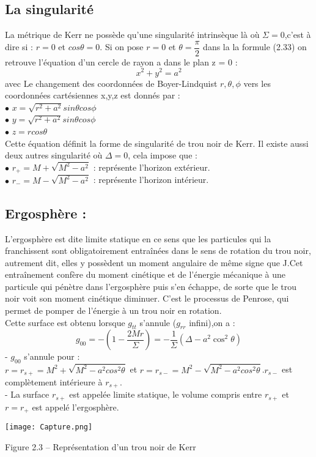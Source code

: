 \documentclass[12pt,  a4paper, openright]{report} %
\begin{document}
\subsection*{La singularité}
La métrique de Kerr ne possède qu’une singularité intrinsèque là où $ \Sigma= 0$,c'est à dire si : $r = 0$ et $ cos\theta = 0$.
Si on pose $r = 0$ et $\theta =\dfrac{\pi}{2}  $ dans la la formule (2.33) on retrouve l’équation d’un cercle de rayon a dans le plan z = 0 :
\begin{equation}
x^{2} + y^{2} = a^{2}
\end{equation}
avec Le changement des coordonnées de Boyer-Lindquist $r,\theta,\phi$ vers les coordonnées cartésiennes x,y,z est donnés par :\\
$\bullet$ $x = \sqrt{r^{2}+a^{2}} sin\theta cos\phi$ \\
$\bullet$ $y = \sqrt{r^{2}+a^{2}}sin\theta cos\phi$ \\
$\bullet$ $z = rcos\theta$ \\
Cette équation définit la forme de singularité de trou noir de Kerr. Il existe aussi deux autres
singularité où $\Delta = 0$, cela impose que :\\
$\bullet$ $r_{+}=M+\sqrt{M^{2}-a^{2}}$ : représente l’horizon extérieur.\\
$\bullet$ $r_{-}=M-\sqrt{M^{2}-a^{2}}$ : représente l’horizon intérieur.
\subsection*{Ergosphère :}
L'ergosphère est dite limite statique en ce sens que les particules qui la franchissent sont obligatoirement entraînées dans le sens de rotation du trou noir, autrement dit, elles y possèdent un moment angulaire de même signe que  J.Cet entraînement confère du moment cinétique et de l'énergie mécanique à une particule qui pénètre dans l'ergosphère puis s'en échappe, de sorte que le trou noir voit son moment cinétique diminuer. C'est le processus de Penrose, qui permet de pomper de l'énergie à un trou noir en rotation. \\
Cette surface est obtenu lorsque $g_{tt}$ s’annule ($g_{rr}$ infini),on a :\\
$$g_{00} = -(1 - \dfrac{2Mr}{\Sigma} ) = -\dfrac{1}{\Sigma}(\Delta - a^{2}\cos^{2}\theta)$$
- $g_{00}$ s’annule pour : \\
$r = r_{s+} = M^{2} + \sqrt{M^{2}-a^{2}cos^{2}\theta}$ et $r = r_{s-} = M^{2} -\sqrt{M^{2}-a^{2} cos^{2}\theta }$.$r_{s-}$ est complètement intérieure à $r_{s+}$.\\
- La surface $r_{s+}$ est appelée limite statique, le volume compris entre $r_{s+}$ et $ r = r_{+} $ est appelé l’ergosphère.
\begin{center}
	\texttt{[image: Capture.png]}
\end{center}
Figure 2.3 – Représentation d’un trou noir de Kerr
\end{document}
